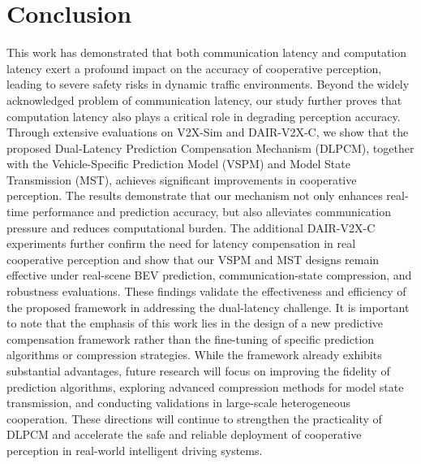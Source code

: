 \section{Conclusion}
This work has demonstrated that both communication latency and computation latency exert a profound impact on the accuracy of cooperative perception, leading to severe safety risks in dynamic traffic environments. Beyond the widely acknowledged problem of communication latency, our study further proves that computation latency also plays a critical role in degrading perception accuracy. 
Through extensive evaluations on V2X-Sim and DAIR-V2X-C, we show that the proposed Dual-Latency Prediction Compensation Mechanism (DLPCM), together with the Vehicle-Specific Prediction Model (VSPM) and Model State Transmission (MST), achieves significant improvements in cooperative perception. The results demonstrate that our mechanism not only enhances real-time performance and prediction accuracy, but also alleviates communication pressure and reduces computational burden. The additional DAIR-V2X-C experiments further confirm the need for latency compensation in real cooperative perception and show that our VSPM and MST designs remain effective under real-scene BEV prediction, communication-state compression, and robustness evaluations. These findings validate the effectiveness and efficiency of the proposed framework in addressing the dual-latency challenge.
It is important to note that the emphasis of this work lies in the design of a new predictive compensation framework rather than the fine-tuning of specific prediction algorithms or compression strategies. While the framework already exhibits substantial advantages, future research will focus on improving the fidelity of prediction algorithms, exploring advanced compression methods for model state transmission, and conducting validations in large-scale heterogeneous cooperation. These directions will continue to strengthen the practicality of DLPCM and accelerate the safe and reliable deployment of cooperative perception in real-world intelligent driving systems.
